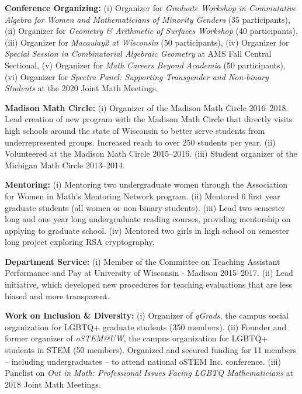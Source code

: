\documentclass[11pt]{article}
\begin{document}
\begin{bibenum}[itemsep=4pt]

    \item \textbf{Conference Organizing:}
        (i) Organizer for \textit{Graduate Workshop in Commutative Algebra for Women and Mathematicians of Minority Genders} (35 participants), 
        (ii) Organizer for \textit{Geometry \& Arithmetic of Surfaces Workshop} (40 participants),
                (iii) Organizer for \textit{Macaulay2 at Wisconsin} (50 participants),
                (iv) Organizer for \textit{Special Session in Combinatorial Algebraic Geometry} at AMS Fall Central Sectional,
         (v) Organizer for \textit{Math Careers Beyond Academia} (50 participants), 
        (vi) Organizer for \textit{Spectra Panel: Supporting Transgender and Non-binary Students} at the 2020 Joint Math Meetings.
    

    \item \textbf{Madison Math Circle:}
    	(i) Organizer of the Madison Math Circle 2016--2018. Lead creation of new program with the Madison Math Circle that directly visits high schools around the state of Wisconsin to better serve students from underrepresented groups. Increased reach to over 250 students per year.
	(ii)  Volunteered at the Madison Math Circle 2015--2016.
	(iii) Student organizer of the Michigan Math Circle 2013--2014.

    \item \textbf{Mentoring:}
        (i) Mentoring two undergraduate women through the Association for Women in Math's Mentoring Network program.
        (ii) Mentored 6 first year graduate students (all women or non-binary students).
        (iii) Lead two semester long and one year long undergraduate reading courses, providing mentorship on applying to graduate school.
        (iv) Mentored two girls in high school on semester long project exploring RSA cryptography.
        
           
    \item \textbf{Department Service:} 
    (i) Member of the Committee on Teaching Assistant Performance and Pay at University of Wisconsin - Madison 2015--2017. 
   (ii) Lead initiative, which developed new procedures for teaching evaluations that are less biased and more transparent. 

    \item \textbf{Work on Inclusion \& Diversity:}
    (i) Organizer of \textit{qGrads}, the campus social organization for LGBTQ+ graduate students (350 members).
    (ii) Founder and former organizer of \textit{oSTEM@UW}, the campus organization for LGBTQ+ students in STEM (50 members). Organized and secured funding for 11 members -- including undergraduates -- to attend national oSTEM Inc. conference. 
    (iii) Panelist on \textit{Out in Math: Professional Issues Facing LGBTQ Mathematicians} at 2018 Joint Math Meetings. 
      

\end{bibenum}
\end{document}
